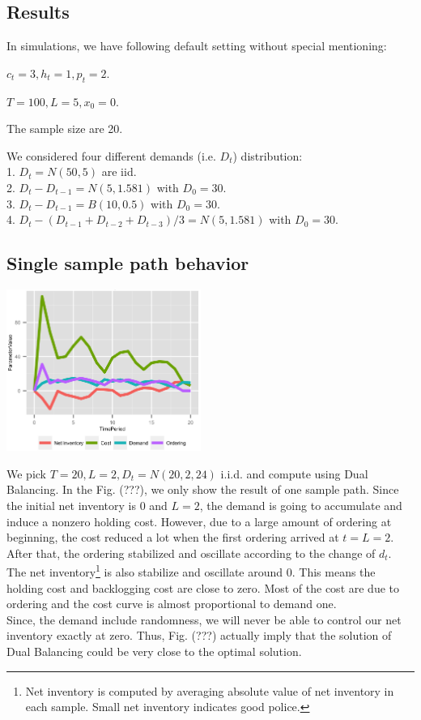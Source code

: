 \documentclass[twoside]{article}
\begin{document}
\begin{multicols}{2}
\section{Results}

In simulations, we have following default setting without special mentioning:
\begin{compactitem}
      \item $c_t = 3, h_t = 1, p_t = 2$.
      \item $T = 100, L = 5, x_0 = 0$.
      \item The sample size are 20.
      \item We considered four different demands (i.e. $D_t$) distribution:\\
            1. $D_t = N(50,5)$ are iid.\\
            2. $D_t-D_{t-1} = N(5,1.581)$ with $D_0=30$.\\
            3. $D_t-D_{t-1} = B(10,0.5)$ with $D_0=30$.\\
            4. $D_t- (D_{t-1} + D_{t-2} + D_{t-3})/3 = N(5,1.581)$ with $D_0=30$.
\end{compactitem}
\subsection{Single sample path behavior}
\begin{center}
  \includegraphics[width=2.5in]{figures/DualBalancingParameters.png}
\end{center}

We pick $T=20,L=2,D_t=N(20,2,24)$ i.i.d. and compute using Dual Balancing. In the Fig. (???), we only show the result of one sample path. Since the initial net inventory is 0 and $L=2$, the demand is going to accumulate and induce a nonzero holding cost. However, due to a large amount of ordering at beginning, the cost reduced a lot when the first ordering arrived at $t=L=2$. After that, the ordering stabilized and oscillate according to the change of $d_t$. The net inventory\footnote{Net inventory is computed by averaging absolute value of net inventory in each sample. Small net inventory indicates good police.} is also stabilize and oscillate around 0. This means the holding cost and backlogging cost are close to zero. Most of the cost are due to ordering and the cost curve is almost proportional to demand one.\\
Since, the demand include randomness, we will never be able to control our net inventory exactly at zero. Thus, Fig. (???) actually imply that the solution of Dual Balancing could be very close to the optimal solution.

\end{multicols}
\end{document}
